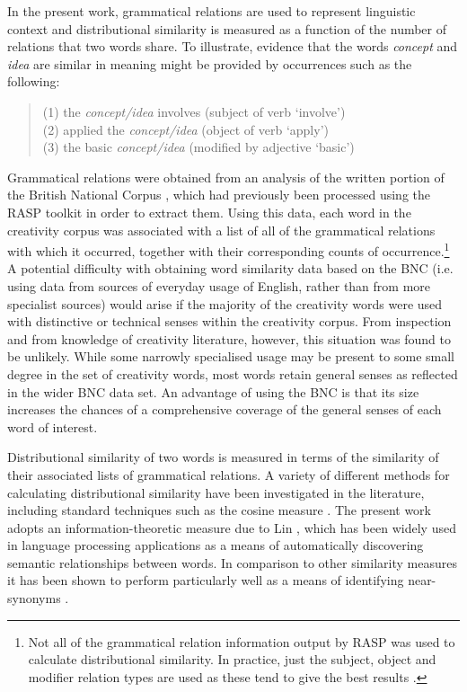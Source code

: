 \documentclass[10pt,letterpaper]{article}
\begin{document}
In the present work, grammatical relations are used to represent linguistic context  and distributional similarity is measured as a function of the number of  relations 
that two words share. To illustrate, evidence that the words {\em concept} and {\em idea} are similar in meaning might be provided by occurrences such as the following: 

\begin{quote}
(1) the {\em concept/idea} involves \hfill (subject of verb `involve')\\
(2) applied the {\em concept/idea\/} \hfill (object of verb `apply') \\
(3) the basic {\em concept/idea\/} \hfill (modified by adjective `basic')
\end{quote}

\noindent
Grammatical relations were obtained from an analysis of the written portion of the British National Corpus \cite{leech92}, which had previously been processed using the RASP toolkit \cite{briscoe06} in order to extract them. Using this data, each word in the creativity corpus was associated with a list of all of the grammatical relations with which it occurred, together with their corresponding counts of occurrence.\footnote{Not all of the grammatical relation information output by RASP was used to calculate distributional similarity. In practice, just the subject, object and modifier relation types are used as these tend to give the best results \cite{weeds03}.} A potential difficulty with obtaining word similarity data based on the BNC (i.e. using data from sources of everyday usage of English, rather than from more specialist sources) would arise if the majority of the creativity words were used with distinctive or technical senses within the creativity corpus. From inspection and from knowledge of creativity literature, however, this situation was found to be unlikely. While some narrowly specialised usage may be present to some small degree in the set of creativity words, most words retain general senses as reflected in the wider BNC data set. An advantage of using the BNC is that its  size increases the chances of a comprehensive coverage of the general senses of each word of interest.

Distributional similarity of two words is measured in terms of the similarity of their associated lists of grammatical relations. A variety of different methods for calculating distributional similarity have been investigated in the literature, including standard techniques such as the cosine measure \cite[for example]{mannschu99}. The present work adopts an information-theoretic measure due to Lin \cite{lin98}, which has been widely used in language processing applications as a means of automatically discovering semantic relationships between words. In comparison to other similarity measures it has been shown to perform particularly well as a means of identifying near-synonyms \cite{weedsweir03,mccanavi09}.
\end{document}
